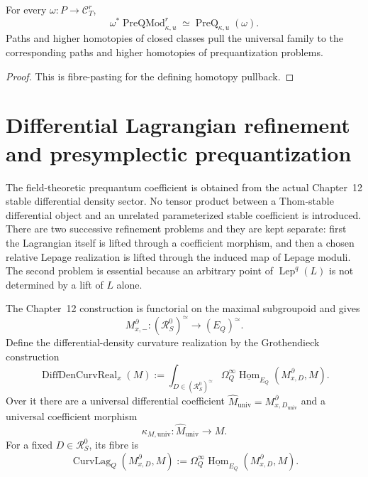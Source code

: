\begin{theorem}
\label{thm:prequantum-individual-as-pullback}
For every $\omega:P\to\mathscr C_T^r$,
\[
\boxed{
\omega^*\operatorname{PreQMod}_{\kappa,u}^r
\simeq
\operatorname{PreQ}_{\kappa,u}(\omega).
}
\]
Paths and higher homotopies of closed classes pull the universal family to the
corresponding paths and higher homotopies of prequantization problems.
\end{theorem}

\begin{proof}
This is fibre-pasting for the defining homotopy pullback.
\end{proof}

\section{Differential Lagrangian refinement and presymplectic prequantization}
\label{sec:prequantum-lagrangians}

The field-theoretic prequantum coefficient is obtained from the actual
Chapter~12 stable differential density sector.  No tensor product between a
Thom-stable differential object and an unrelated parameterized stable coefficient
is introduced.  There are two successive refinement problems and they are kept
separate: first the Lagrangian itself is lifted through a coefficient morphism,
and then a chosen relative Lepage realization is lifted through the induced map of
Lepage moduli.  The second problem is essential because an arbitrary point of
$\operatorname{Lep}^q(L)$ is not determined by a lift of $L$ alone.

\begin{definition}
\label{def:prequantum-differential-lagrangian-curvature-realization}
The Chapter~12 construction is functorial on the maximal subgroupoid and gives
\[
M^\partial_{x,-}:(\mathcal R_S^0)^\simeq\longrightarrow(E_Q)^\simeq.
\]
Define the differential-density curvature realization by the Grothendieck
construction
\[
\boxed{
\operatorname{DiffDenCurvReal}_x(M)
:=
\int_{D\in(\mathcal R_S^0)^\simeq}
\Omega_Q^\infty
\underline{\operatorname{Hom}}_{E_Q}(M^\partial_{x,D},M).
}
\]
Over it there are a universal differential coefficient
$\widehat M_{\mathrm{univ}}=M^\partial_{x,D_{\mathrm{univ}}}$ and a universal
coefficient morphism
\[
\kappa_{M,\mathrm{univ}}:\widehat M_{\mathrm{univ}}\longrightarrow M.
\]
For a fixed $D\in\mathcal R_S^0$, its fibre is
\[
\boxed{
\operatorname{CurvLag}_Q(M^\partial_{x,D},M)
:=
\Omega_Q^\infty
\underline{\operatorname{Hom}}_{E_Q}(M^\partial_{x,D},M).
}
\]
\end{definition}

